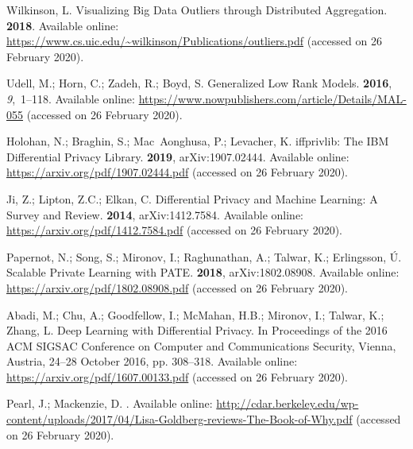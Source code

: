 \documentclass[information,article,accept,moreauthors,pdftex]{Definitions/mdpi}
\begin{document}
\begin{thebibliography}{999}
Wilkinson, L.
\newblock Visualizing Big Data Outliers through Distributed Aggregation.
 {\bf
  2018}.
\newblock Available online: 
  \url{https://www.cs.uic.edu/~wilkinson/Publications/outliers.pdf} (accessed on 26 February 2020).

Udell, M.; Horn, C.; Zadeh, R.; Boyd, S.
\newblock Generalized {L}ow {R}ank {M}odels.
  {\bf 2016}, {\em 9},~1--118.
\newblock Available online: \url{https://www.nowpublishers.com/article/Details/MAL-055} (accessed on 26 February 2020).

Holohan, N.; Braghin, S.; Mac~Aonghusa, P.; Levacher, K.
iffprivlib: {T}he {I}{B}{M} {D}ifferential {P}rivacy {L}ibrary.
 {\bf 2019}, arXiv:1907.02444.
\newblock Available online: \url{https://arxiv.org/pdf/1907.02444.pdf} (accessed on 26 February 2020).

Ji, Z.; Lipton, Z.C.; Elkan, C.
\newblock Differential {P}rivacy and {M}achine {L}earning: {A} {S}urvey and
  {R}eview.
 {\bf 2014}, arXiv:1412.7584.
\newblock Available online: \url{https://arxiv.org/pdf/1412.7584.pdf} (accessed on 26 February 2020).

Papernot, N.; Song, S.; Mironov, I.; Raghunathan, A.; Talwar, K.; Erlingsson,
  {\'U}.
\newblock Scalable {P}rivate {L}earning with {P}{A}{T}{E}.
 {\bf 2018}, arXiv:1802.08908.
\newblock Available online: \url{https://arxiv.org/pdf/1802.08908.pdf} (accessed on 26 February 2020).

Abadi, M.; Chu, A.; Goodfellow, I.; McMahan, H.B.; Mironov, I.; Talwar, K.;
  Zhang, L.
\newblock Deep {L}earning with {D}ifferential {P}rivacy.
\newblock  In Proceedings of the 2016 ACM SIGSAC Conference on Computer and
  Communications Security, Vienna, Austria, 24--28 October 2016, pp. 308--318. 
\newblock Available online: \url{https://arxiv.org/pdf/1607.00133.pdf} (accessed on 26 February 2020).

Pearl, J.; Mackenzie, D.
.
\newblock Available online: 
  \url{http://cdar.berkeley.edu/wp-content/uploads/2017/04/Lisa-Goldberg-reviews-The-Book-of-Why.pdf} (accessed on 26 February 2020).


\end{thebibliography}
\end{document}
